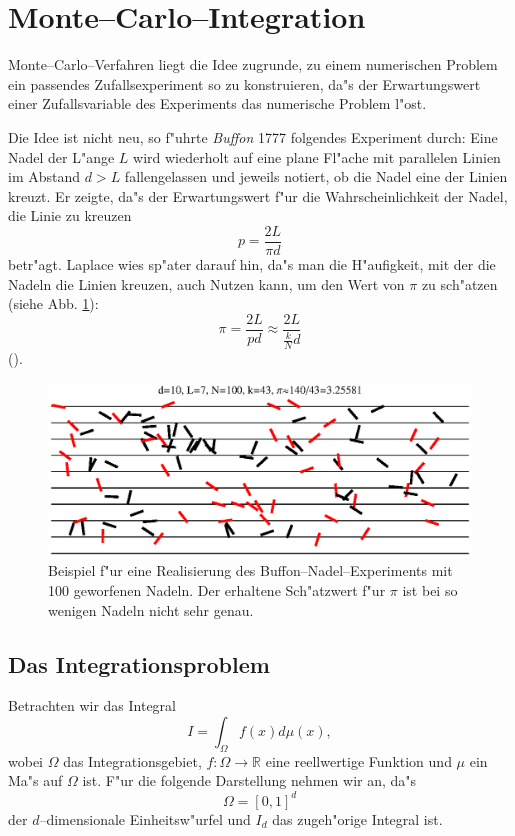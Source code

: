 	\section{Monte--Carlo--Integration}
	Monte--Carlo--Verfahren liegt die Idee zugrunde, zu einem numerischen Problem ein passendes Zufallsexperiment so zu konstruieren, da"s der Erwartungswert einer Zufallsvariable des Experiments das numerische Problem l"ost.
	
	Die Idee ist nicht neu, so f"uhrte {\em Buffon} 1777 folgendes Experiment durch: Eine Nadel der L"ange $L$ wird wiederholt auf eine plane Fl"ache mit parallelen Linien im Abstand $d>L$ fallengelassen und jeweils notiert, ob die Nadel eine der Linien kreuzt. Er zeigte, da"s der Erwartungswert f"ur die Wahrscheinlichkeit der Nadel, die Linie zu kreuzen $$p=\frac{2L}{\pi d}$$ betr"agt. Laplace wies sp"ater darauf hin, da"s  man die H"aufigkeit, mit der die Nadeln die Linien kreuzen, auch Nutzen kann, um den Wert von $\pi$ zu sch"atzen (siehe Abb. \ref{fig:buffon}): $$\pi=\frac{2L}{p d}\approx \frac{2L}{\frac{k}{N}d}$$
	().
	\begin{figure}
		\centering
		\includegraphics[height=0.3\textheight]{buffonsneedles.eps}
		\caption{Beispiel f"ur eine Realisierung des Buffon--Nadel--Experiments mit 100 geworfenen Nadeln. Der erhaltene Sch"atzwert f"ur $\pi$ ist bei so wenigen Nadeln nicht sehr genau.}
		\label{fig:buffon}
	\end{figure}
	
	\subsection{Das Integrationsproblem}\label{subsec:integrationsproblem}
	Betrachten wir das Integral
	\begin{equation}
		I=\int_\Omega f(x) d\mu(x),
		\label{eq:integration_problem}
	\end{equation}
	wobei $\Omega$ das Integrationsgebiet, $f : \Omega \to \mathbb{R}$ eine reellwertige Funktion und $\mu$ ein Ma"s auf $\Omega$ ist. F"ur die folgende Darstellung nehmen wir an, da"s $$\Omega=[0,1]^d$$ der $d$--dimensionale Einheitsw"urfel und $I_d$ das zugeh"orige Integral ist.
